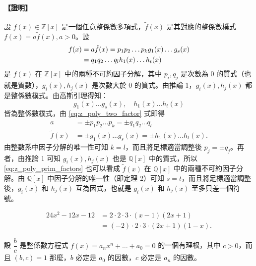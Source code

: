 \paragraph{【證明】}
設 $f(x) \in \mathbb{Z}[x]$ 是一個任意整係數多項式，$\tilde{f}(x)$ 是其對應的整係數樸式 $f(x) = a\tilde{f}(x), a > 0$。設
\begin{align}
  f(x) &= a\tilde{f}(x) = p_1 p_2 \dots p_k g_1(x) \dots g_s(x) \notag \\
  &= q_1 q_2 \dots q_l h_1(x) \dots h_t(x) \label{eq:z_poly_two_factor}
\end{align}
是 $f(x)$ 在 $\mathbb{Z}[x]$ 中的兩種不可約因子分解，其中 $p_i, q_j$ 是次數為 $0$ 的質式（也就是質數），$g_i(x), h_j(x)$ 是次數大於 $0$ 的質式。由推論 1，$g_i(x), h_j(x)$ 都是整係數樸式。由高斯引理得知：
\begin{equation*}
  g_1(x) \dots g_s(x), \quad h_1(x) \dots h_t(x)
\end{equation*}
皆為整係數樸式，由 \eqref{eq:z_poly_two_factor} 式即得
\begin{align}
  a &= \pm p_1 p_2 \dots p_k = \pm q_1 q_2 \dots q_l \label{eq:z_int_factors} \\
  \tilde{f}(x) &= \pm g_1(x) \dots g_s(x) = \pm h_1(x) \dots h_t(x). \label{eq:z_poly_prim_factors}
\end{align}
由整數系中因子分解的唯一性可知 $k=l$，而且將足標適當調整後 $p_j = \pm q_j$。再者，由推論 1 可知 $g_i(x), h_j(x)$ 也是 $\mathbb{Q}[x]$ 中的質式，所以 \eqref{eq:z_poly_prim_factors} 也可以看成 $\tilde{f}(x)$ 在 $\mathbb{Q}[x]$ 中的兩種不可約因子分解。由 $\mathbb{Q}[x]$ 中因子分解的唯一性（即定理 2）可知 $s=t$，而且將足標適當調整後，$g_i(x)$ 和 $h_j(x)$ 互為因式，也就是 $g_i(x)$ 和 $h_j(x)$ 至多只差一個符號。

\begin{example}\label{ex:7-2-14}
\begin{align*}
  24x^2-12x-12 &= 2 \cdot 2 \cdot 3 \cdot (x-1)(2x+1) \\
  &= (-2) \cdot 2 \cdot 3 \cdot (2x+1)(1-x).
\end{align*}
\end{example}

\begin{corollary}\label{cor:rational_root}
設 $\dfrac{b}{c}$ 是整係數方程式 $f(x) = a_n x^n + \dots + a_0 = 0$ 的一個有理根，其中 $c > 0$，而且 $(b, c) = 1$ 那麼，$b$ 必定是 $a_0$ 的因數，$c$ 必定是 $a_n$ 的因數。
\end{corollary}

